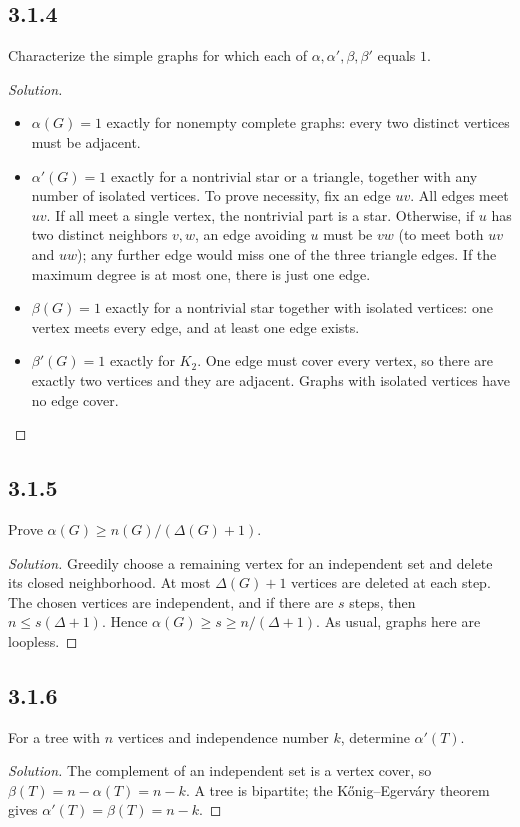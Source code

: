 \documentclass[12pt]{amsart}
\newenvironment{solution}{\begin{proof}[Solution]}{\end{proof}}
\begin{document}
    \subsection*{3.1.4} Characterize the simple graphs for which each of $\alpha,\alpha',\beta,\beta'$ equals $1$.
    \begin{solution}\begin{itemize}[leftmargin=*]
\item $\alpha(G)=1$ exactly for nonempty complete graphs: every two distinct vertices must be adjacent.
\item $\alpha'(G)=1$ exactly for a nontrivial star or a triangle, together with any number of isolated vertices. To prove necessity, fix an edge $uv$. All edges meet $uv$. If all meet a single vertex, the nontrivial part is a star. Otherwise, if $u$ has two distinct neighbors $v,w$, an edge avoiding $u$ must be $vw$ (to meet both $uv$ and $uw$); any further edge would miss one of the three triangle edges. If the maximum degree is at most one, there is just one edge.
\item $\beta(G)=1$ exactly for a nontrivial star together with isolated vertices: one vertex meets every edge, and at least one edge exists.
\item $\beta'(G)=1$ exactly for $K_2$. One edge must cover every vertex, so there are exactly two vertices and they are adjacent. Graphs with isolated vertices have no edge cover.
        \end{itemize}\end{solution}

    \subsection*{3.1.5} Prove $\alpha(G)\ge n(G)/(\Delta(G)+1)$.
    \begin{solution}Greedily choose a remaining vertex for an independent set and delete its closed neighborhood. At most $\Delta(G)+1$ vertices are deleted at each step. The chosen vertices are independent, and if there are $s$ steps, then $n\le s(\Delta+1)$. Hence $\alpha(G)\ge s\ge n/(\Delta+1)$. As usual, graphs here are loopless.\end{solution}

    \subsection*{3.1.6} For a tree with $n$ vertices and independence number $k$, determine $\alpha'(T)$.
    \begin{solution}The complement of an independent set is a vertex cover, so $\beta(T)=n-\alpha(T)=n-k$. A tree is bipartite; the K\H{o}nig--Egerv\'ary theorem gives $\alpha'(T)=\beta(T)=n-k$.\end{solution}
\end{document}

